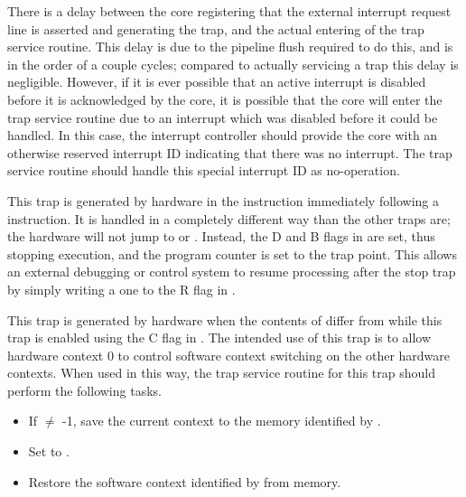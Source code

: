 There is a delay between the core registering that the external interrupt
request line is asserted and generating the trap, and the actual entering of the
trap service routine. This delay is due to the pipeline flush required to do
this, and is in the order of a couple cycles; compared to actually servicing a
trap this delay is negligible. However, if it is ever possible that an active
interrupt is disabled before it is acknowledged by the core, it is possible that
the core will enter the trap service routine due to an interrupt which was
disabled before it could be handled. In this case, the interrupt controller
should provide the core with an otherwise reserved interrupt ID indicating that
there was no interrupt. The trap service routine should handle this special
interrupt ID as no-operation.



This trap is generated by hardware in the instruction immediately following a
 instruction. It is handled in a completely different way than the
other traps are; the hardware will not jump to  or . Instead,
the D and B flags in  are set, thus stopping execution, and the
program counter is set to the trap point. This allows an external debugging or
control system to resume processing after the stop trap by simply writing
a one to the R flag in .



This trap is generated by hardware when the contents of  differ from
 while this trap is enabled using the C flag in . The
intended use of this trap is to allow hardware context 0 to control software
context switching on the other hardware contexts. When used in this way, the
trap service routine for this trap should perform the following tasks.

\begin{itemize}
\item If  $\neq$ -1, save the current context to the memory
identified by .
\item Set  to .
\item Restore the software context identified by  from memory.
\end{itemize}

